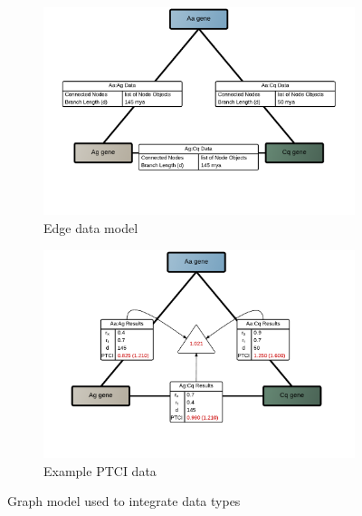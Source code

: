 \begin{figure}[]
\begin{subfigure}[t]{.5\linewidth}
    \includegraphics[width=\linewidth]{figures/figs/gfunc_graph_figs/ortho-graph-edge-data.pdf}
    \caption{Edge data model}\label{fig:nway-ortholog-graph-edge-data}
    \end{subfigure}%
% 
% 
%     
    \begin{subfigure}[t]{.5\linewidth}
    \centering
    \includegraphics[width=\linewidth]{figures/figs/gfunc_graph_figs/ortho-graph-ptci.pdf}
    \caption{Example PTCI data}\label{fig:nway-ortholog-graph-ptci}
    \end{subfigure}
% 
% 
% 
\caption{Graph model used to integrate data types}\label{fig:nway-ortholog-graph}
\end{figure}